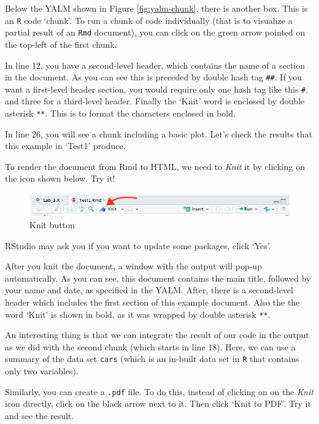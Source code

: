 \documentclass[
]{book}
\begin{document}
Below the YALM shown in Figure \ref{fig:yalm-chunk}, there is another box. This is an \texttt{R} code `chunk'. To run a chunk of code individually (that is to visualize a partial result of an \texttt{Rmd} document), you can click on the green arrow pointed on the top-left of the first chunk.

In line 12, you have a second-level header, which contains the name of a section in the document. As you can see this is preceded by double hash tag \texttt{\#\#}. If you want a first-level header section, you would require only one hash tag like this \texttt{\#}, and three for a third-level header. Finally the `Knit' word is enclosed by double asterisk \texttt{**}. This is to format the characters enclosed in bold.

In line 26, you will see a chunk including a basic plot. Let's check the results that this example in `Test1' produce.

To render the document from Rmd to HTML, we need to \emph{Knit} it by clicking on the icon shown below. Try it!

\begin{figure}
\centering
\includegraphics{./images/lab4_rmd_knit.png}
\caption{Knit button}
\end{figure}

RStudio may ask you if you want to update some packages, click `Yes'.

After you knit the document, a window with the output will pop-up automatically. As you can see, this document contains the main title, followed by your name and date, as specified in the YALM. After, there is a second-level header which includes the first section of this example document. Also the the word `Knit' is shown in bold, as it was wrapped by double asterisk \texttt{**}.

An interesting thing is that we can integrate the result of our code in the output as we did with the second chunk (which starts in line 18). Here, we can use a summary of the data set \texttt{cars} (which is an in-built data set in \texttt{R} that contains only two variables).

Similarly, you can create a \texttt{.pdf} file. To do this, instead of clicking on on the \emph{Knit} icon directly, click on the black arrow next to it. Then click `Knit to PDF'. Try it and see the result.
\end{document}
